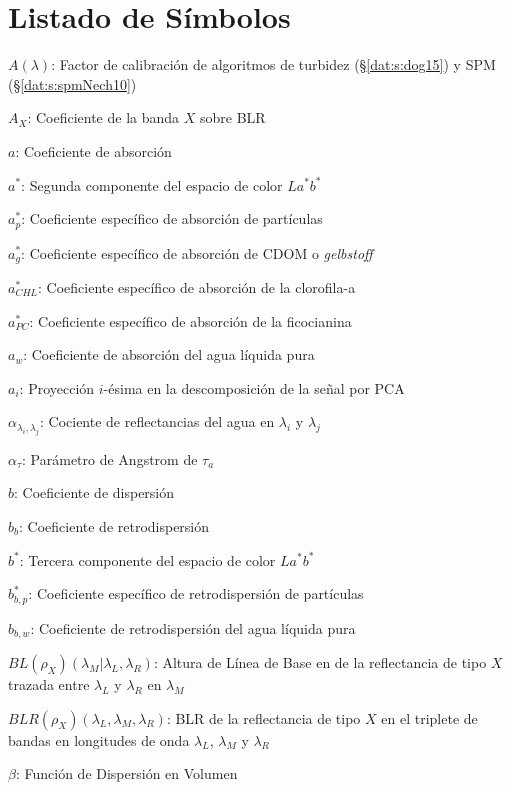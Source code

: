 \chapter{Listado de Símbolos}
\label{sym}

{\parindent0pt

$A(\lambda)$: Factor de calibración de algoritmos de turbidez (\S \ref{dat:s:dog15}) y SPM (\S \ref{dat:s:spmNech10})

$A_{X}$: Coeficiente de la banda $X$ sobre BLR

$a$: Coeficiente de absorción

$a^{*}$: Segunda componente del espacio de color $La^{*}b^{*}$

$a_{p}^{*}$: Coeficiente específico de absorción de partículas

$a_{g}^{*}$: Coeficiente específico de absorción de CDOM o \textit{gelbstoff}

$a_{CHL}^{*}$: Coeficiente específico de absorción de la clorofila-a

$a_{PC}^{*}$: Coeficiente específico de absorción de la ficocianina

$a_{w}$: Coeficiente de absorción del agua líquida pura

$a_{i}$: Proyección $i$-ésima en la descomposición de la señal por PCA

$\alpha_{\lambda_{i},\lambda_{j}}$: Cociente de reflectancias del agua en $\lambda_{i}$ y $\lambda_{j}$

$\alpha_{\tau}$: Parámetro de Angstrom de $\tau_{a}$

$b$: Coeficiente de dispersión

$b_{b}$: Coeficiente de retrodispersión

$b^{*}$: Tercera componente del espacio de color $La^{*}b^{*}$

$b_{b,p}^{*}$: Coeficiente específico de retrodispersión de partículas

$b_{b,w}$: Coeficiente de retrodispersión del agua líquida pura

$BL(\rho_{X})(\lambda_{M} |\lambda_{L},\lambda_{R})$: Altura de Línea de Base en de la reflectancia de tipo $X$ trazada entre $\lambda_{L}$ y $\lambda_{R}$ en $\lambda_{M}$

$BLR(\rho_{X})(\lambda_{L}, \lambda_{M}, \lambda_{R})$: BLR de la reflectancia de tipo $X$ en el triplete de bandas en longitudes de onda $\lambda_{L}$, $\lambda_{M}$ y $\lambda_{R}$

$\beta$: Función de Dispersión en Volumen

}
